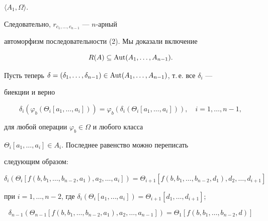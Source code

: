 \begin{pf}
$\langle A_1, \Omega \rangle $.


Следовательно, $r_{c_1,\dotsc,c_{n-1}}$ --- $n$-арный


автоморфизм последовательности (2). Мы доказали включение


\begin{equation}


R(A) \subseteq \Aut(A_1,\dotsc, A_{n-1}).


\end{equation}





Пусть теперь $\delta = (\delta_1,\dotsc, \delta_{n-1})\in


\Aut(A_1,\dotsc, A_{n-1})$, т.\,е. все $\delta_i$ ---


биекции и верно


\begin{equation}


\delta_i(\varphi_b (\Theta_i[a_1,\dotsc, a_i])) =


\varphi_b(\delta_i(\Theta_i[a_1,\dotsc, a_i])),\quad


i = 1,\dotsc, n-1,


\end{equation}


для любой операции $\varphi_b\in \Omega$ и любого класса


$\Theta_i[a_1,\dotsc, a_i]\in A_i$. Последнее равенство можно переписать


следующим образом:


\begin{equation}


\delta_i(\Theta_i[f(b, b_1,\dotsc,b_{n-2}, a_1),


a_2,\dotsc,a_i]) =


\Theta_{i+1}[f(b, b_1,\dotsc, b_{n-2},d_1),


d_2,\dotsc,d_{i+1}]


\end{equation}


при $i = 1,\dotsc,n-2$, где $\delta_i(\Theta_i[a_1,\dotsc, a_i]) =


\Theta_{i+1}[d_1,\dotsc, d_{i+1}]$;


\begin{equation}


\delta_{n-1}(\Theta_{n-1}[f(b, b_1,\dotsc, b_{n-2}, a_1), a_2,\dotsc,


a_{n-1}]) = \Theta_1[f(b, b_1,\dotsc, b_{n-2}, d)]


\end{equation}



\end{pf}
